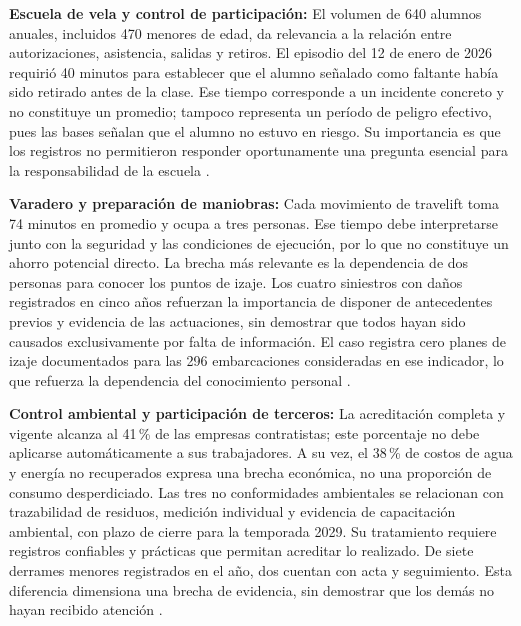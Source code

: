 \textbf{Escuela de vela y control de participación:} El volumen de 640 alumnos anuales, incluidos 470 menores de edad, da relevancia a la relación entre autorizaciones, asistencia, salidas y retiros. El episodio del 12 de enero de 2026 requirió 40 minutos para establecer que el alumno señalado como faltante había sido retirado antes de la clase. Ese tiempo corresponde a un incidente concreto y no constituye un promedio; tampoco representa un período de peligro efectivo, pues las bases señalan que el alumno no estuvo en riesgo. Su importancia es que los registros no permitieron responder oportunamente una pregunta esencial para la responsabilidad de la escuela \parencite[cap.~1, p.~4; cap.~2, secc.~2.2, p.~6; cap.~4, secc.~4.9, p.~12]{pucv-caso07-2026}.

\textbf{Varadero y preparación de maniobras:} Cada movimiento de travelift toma 74 minutos en promedio y ocupa a tres personas. Ese tiempo debe interpretarse junto con la seguridad y las condiciones de ejecución, por lo que no constituye un ahorro potencial directo. La brecha más relevante es la dependencia de dos personas para conocer los puntos de izaje. Los cuatro siniestros con daños registrados en cinco años refuerzan la importancia de disponer de antecedentes previos y evidencia de las actuaciones, sin demostrar que todos hayan sido causados exclusivamente por falta de información. El caso registra cero planes de izaje documentados para las 296 embarcaciones consideradas en ese indicador, lo que refuerza la dependencia del conocimiento personal \parencite[cap.~4, secc.~4.6, p.~11; cap.~7, secc.~7.3, p.~16]{pucv-caso07-2026}.

\textbf{Control ambiental y participación de terceros:} La acreditación completa y vigente alcanza al 41\,\% de las empresas contratistas; este porcentaje no debe aplicarse automáticamente a sus trabajadores. A su vez, el 38\,\% de costos de agua y energía no recuperados expresa una brecha económica, no una proporción de consumo desperdiciado. Las tres no conformidades ambientales se relacionan con trazabilidad de residuos, medición individual y evidencia de capacitación ambiental, con plazo de cierre para la temporada 2029. Su tratamiento requiere registros confiables y prácticas que permitan acreditar lo realizado. De siete derrames menores registrados en el año, dos cuentan con acta y seguimiento. Esta diferencia dimensiona una brecha de evidencia, sin demostrar que los demás no hayan recibido atención \parencite[cap.~1, pp.~4-5; cap.~4, seccs.~4.7 y 4.12, pp.~11-13; cap.~7, secc.~7.3, pp.~16-17; cap.~18, criterio~19, p.~44]{pucv-caso07-2026}.

